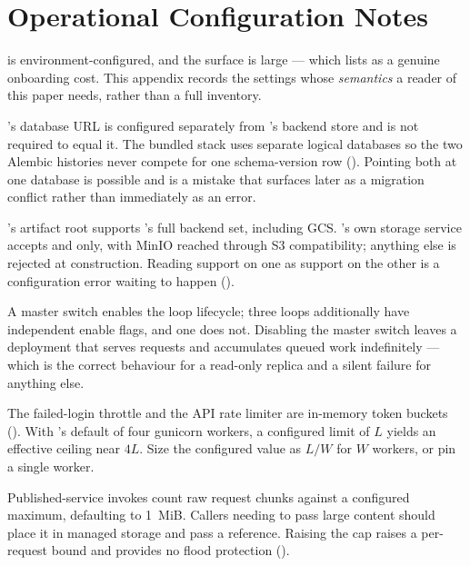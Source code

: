 \section{Operational Configuration Notes}
\label{app:config}

\sys is environment-configured, and the surface is large --- which
 lists as a genuine onboarding cost. This appendix records the
settings whose \emph{semantics} a reader of this paper needs, rather than a full
inventory.

 \sys's database URL is
configured separately from \mlflow{}'s backend store and is not required to equal
it. The bundled stack uses separate logical databases so the two Alembic histories
never compete for one schema-version row (). Pointing both at one
database is possible and is a mistake that surfaces later as a migration conflict
rather than immediately as an error.

 \mlflow{}'s artifact root
supports \mlflow{}'s full backend set, including GCS. \sys's own storage service
accepts  and  only, with MinIO reached through S3
compatibility; anything else is rejected at construction. Reading support on one as
support on the other is a configuration error waiting to happen
().

 A master switch enables the loop
lifecycle; three loops additionally have independent enable flags, and one does not.
Disabling the master switch leaves a deployment that serves requests and accumulates
queued work indefinitely --- which is the correct behaviour for a read-only replica
and a silent failure for anything else.

 The failed-login throttle and the API rate limiter
are in-memory token buckets (). With \mlflow{}'s default of four
gunicorn workers, a configured limit of $L$ yields an effective ceiling near $4L$.
Size the configured value as $L/W$ for $W$ workers, or pin a single worker.

 Published-service invokes count raw
request chunks against a configured maximum, defaulting to 1~MiB. Callers needing to
pass large content should place it in managed storage and pass a reference. Raising
the cap raises a per-request bound and provides no flood protection
().

